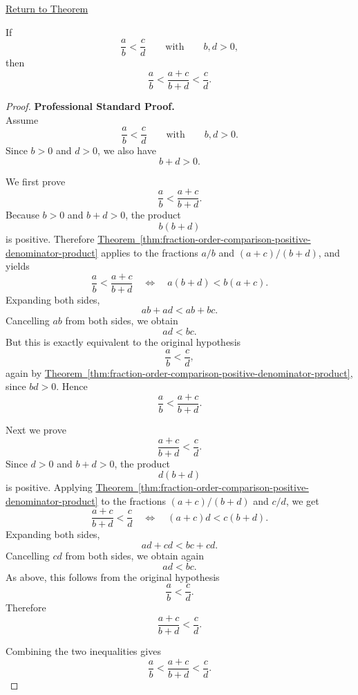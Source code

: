 \newpage
{}
\label{prf:mediant-inequality}

\begin{remark*}[Return]
\hyperref[thm:mediant-inequality]{Return to Theorem}
\end{remark*}

\begin{theorem*}
If
\[
\frac{a}{b}<\frac{c}{d}
\qquad\text{with}\qquad b,d>0,
\]
then
\[
\frac{a}{b}<\frac{a+c}{b+d}<\frac{c}{d}.
\]
\end{theorem*}

\begin{proof}
\textbf{Professional Standard Proof.}~\\
Assume
\[
\frac{a}{b}<\frac{c}{d}
\qquad\text{with}\qquad
b,d>0.
\]
Since $b>0$ and $d>0$, we also have
\[
b+d>0.
\]

We first prove
\[
\frac{a}{b}<\frac{a+c}{b+d}.
\]
Because $b>0$ and $b+d>0$, the product
\[
b(b+d)
\]
is positive.  Therefore
\hyperref[thm:fraction-order-comparison-positive-denominator-product]{Theorem~\ref*{thm:fraction-order-comparison-positive-denominator-product}}
applies to the fractions $a/b$ and $(a+c)/(b+d)$, and yields
\[
\frac{a}{b}<\frac{a+c}{b+d}
\quad\Longleftrightarrow\quad
a(b+d)<b(a+c).
\]
Expanding both sides,
\[
ab+ad<ab+bc.
\]
Cancelling $ab$ from both sides, we obtain
\[
ad<bc.
\]
But this is exactly equivalent to the original hypothesis
\[
\frac{a}{b}<\frac{c}{d},
\]
again by
\hyperref[thm:fraction-order-comparison-positive-denominator-product]{Theorem~\ref*{thm:fraction-order-comparison-positive-denominator-product}},
since $bd>0$.  Hence
\[
\frac{a}{b}<\frac{a+c}{b+d}.
\]

Next we prove
\[
\frac{a+c}{b+d}<\frac{c}{d}.
\]
Since $d>0$ and $b+d>0$, the product
\[
d(b+d)
\]
is positive.  Applying
\hyperref[thm:fraction-order-comparison-positive-denominator-product]{Theorem~\ref*{thm:fraction-order-comparison-positive-denominator-product}}
to the fractions $(a+c)/(b+d)$ and $c/d$, we get
\[
\frac{a+c}{b+d}<\frac{c}{d}
\quad\Longleftrightarrow\quad
(a+c)d<c(b+d).
\]
Expanding both sides,
\[
ad+cd<bc+cd.
\]
Cancelling $cd$ from both sides, we obtain again
\[
ad<bc.
\]
As above, this follows from the original hypothesis
\[
\frac{a}{b}<\frac{c}{d}.
\]
Therefore
\[
\frac{a+c}{b+d}<\frac{c}{d}.
\]

Combining the two inequalities gives
\[
\frac{a}{b}<\frac{a+c}{b+d}<\frac{c}{d}.
\]
\end{proof}

